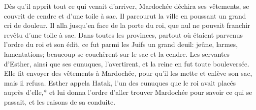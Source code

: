 Dès qu’il apprit tout ce qui venait d’arriver,
	Mardochée déchira ses vêtements, se couvrit de cendre et d’une toile à sac.
Il parcourut la ville en poussant un grand cri de douleur.
Il alla jusqu’en face de la porte du roi,
	que nul ne pouvait franchir revêtu d’une toile à sac.
Dans toutes les provinces, partout où étaient parvenus l’ordre du roi et son édit,
	ce fut parmi les Juifs un grand deuil:
	jeûne, larmes, lamentations; beaucoup se couchèrent sur le sac et la cendre.
Les servantes d’Esther, ainsi que ses eunuques, l’avertirent,
	et la reine en fut toute bouleversée.
Elle fit envoyer des vêtements à Mardochée, pour qu’il les mette et enlève son sac,
	mais il refusa.
Esther appela Hatak, l’un des eunuques que le roi avait placés auprès d’elle,*
	et lui donna l’ordre d’aller trouver Mardochée pour savoir ce qui se passait,
	et les raisons de sa conduite.
